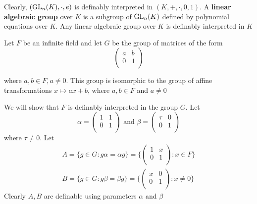 \documentclass[11pt]{article}
\begin{document}
Clearly, \((\text{GL}_n(K),\cdot,e)\) is definably interpreted in \((K,+,\cdot,0,1)\).
A \textbf{linear algebraic group} over \(K\) is a subgroup of \(\text{GL}_n(K)\) defined by
polynomial equations over \(K\). Any linear algebraic group over \(K\) is
definably interpreted in \(K\)

Let \(F\) be an infinite field and let \(G\) be the group of matrices of the form 
\[
\begin{pmatrix}
 a & b \\
 0 & 1 \\
\end{pmatrix}
\]

where \(a,b\in F, a\neq 0\). This group is isomorphic to the group of affine
transformations \(x\mapsto ax+b\), where \(a,b\in F\) and \(a\neq 0\)

We will show that \(F\) is definably interpreted in the group \(G\). Let
\begin{equation*}
 \alpha=\begin{pmatrix}
        1&1\\
        0&1\\
        \end{pmatrix}\text{ and }
\beta=\begin{pmatrix}
\tau&0\\
0&1\\
      \end{pmatrix}
\end{equation*}
where \(\tau\neq 0\). Let
\begin{gather*}
A=\{g\in G:g\alpha=\alpha g\}=\{\begin{pmatrix}
1&x\\
0&1\\
                                \end{pmatrix}:x\in F\}\\
B=\{g\in G:g\beta=\beta g\}=\{\begin{pmatrix}
x&0\\
0&1\\
                                \end{pmatrix}:x\neq 0\}
\end{gather*}
Clearly \(A,B\) are definable using parameters \(\alpha\) and \(\beta\)
\end{document}

